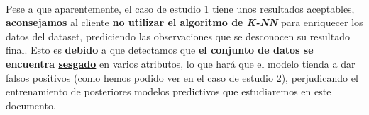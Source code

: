\paragraph{}
Pese a que aparentemente, el caso de estudio 1 tiene unos resultados aceptables, \textbf{aconsejamos} al cliente \textbf{no utilizar el algoritmo de \textit{K-NN}} para enriquecer los datos del dataset, prediciendo las observaciones que se desconocen su resultado final. Esto es \textbf{debido} a que detectamos que \textbf{el conjunto de datos se encuentra \hyperref[resultados:knn_caracteristicas]{sesgado}} en varios atributos, lo que hará que el modelo tienda a dar falsos positivos (como hemos podido ver en el caso de estudio 2), perjudicando el entrenamiento de posteriores modelos predictivos que estudiaremos en este documento.